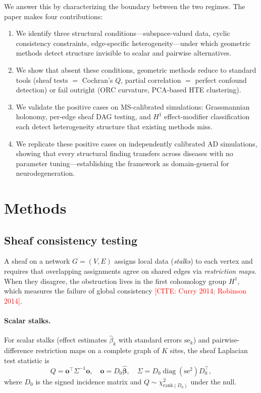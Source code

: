 \documentclass[11pt]{article}
\newcommand{\misscite}[1]{\textcolor{red}{[CITE: #1]}}
\begin{document}
We answer this by characterizing the boundary between the two regimes.
The paper makes four contributions:
\begin{enumerate}[nosep]
    \item We identify three structural conditions---subspace-valued data, cyclic consistency constraints, edge-specific heterogeneity---under which geometric methods detect structure invisible to scalar and pairwise alternatives.
    \item We show that absent these conditions, geometric methods reduce to standard tools (sheaf tests $=$ Cochran's $Q$, partial correlation $=$ perfect confound detection) or fail outright (ORC curvature, PCA-based HTE clustering).
    \item We validate the positive cases on MS-calibrated simulations: Grassmannian holonomy, per-edge sheaf DAG testing, and $H^1$ effect-modifier classification each detect heterogeneity structure that existing methods miss.
    \item We replicate these positive cases on independently calibrated AD simulations, showing that every structural finding transfers across diseases with no parameter tuning---establishing the framework as domain-general for neurodegeneration.
\end{enumerate}

\section{Methods}
\label{sec:methods}

\subsection{Sheaf consistency testing}
\label{sec:meth-sheaf}

A sheaf on a network $G = (V, E)$ assigns local data (\emph{stalks}) to each vertex and requires that overlapping assignments agree on shared edges via \emph{restriction maps}.
When they disagree, the obstruction lives in the first cohomology group $H^1$, which measures the failure of global consistency \misscite{Curry 2014; Robinson 2014}.

\paragraph{Scalar stalks.}
For scalar stalks (effect estimates $\hat\beta_k$ with standard errors $\mathrm{se}_k$) and pairwise-difference restriction maps on a complete graph of $K$ sites, the sheaf Laplacian test statistic is
\begin{equation}
    Q = \mathbf{o}^\top \Sigma^{-1} \mathbf{o}, \quad
    \mathbf{o} = D_0 \boldsymbol{\hat\beta}, \quad
    \Sigma = D_0 \operatorname{diag}(\mathrm{se}^2) D_0^\top,
    \label{eq:sheaf-Q}
\end{equation}
where $D_0$ is the signed incidence matrix and $Q \sim \chi^2_{\mathrm{rank}(D_0)}$ under the null.
\end{document}
